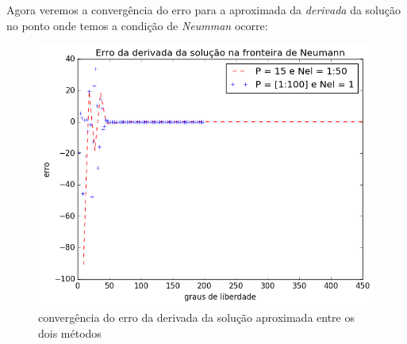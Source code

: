  Agora veremos a convergência do erro para a aproximada da \emph{derivada} da solução no ponto onde temos a condição de \emph{Neumman} ocorre:
\begin{figure}[H]
\centering
\includegraphics[width=.8\textwidth,center]{figuras/erro_derivada.png}
\caption{convergência do erro da derivada da solução aproximada entre os dois métodos} 
\end{figure}

